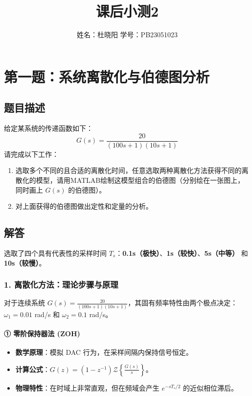 \documentclass{article}
\title{课后小测2}
\author{姓名：杜晓阳 \quad 学号：PB23051023}
\date{}
\begin{document}
\maketitle

\section*{第一题：系统离散化与伯德图分析}

\subsection*{题目描述}
给定某系统的传递函数如下：
\[
G(s) = \frac{20}{(100s+1)(10s+1)}
\]
请完成以下工作：
\begin{enumerate}
    \item 选取多个不同的且合适的离散化时间，任意选取两种离散化方法获得不同的离散化的模型，请用MATLAB绘制这模型组合的伯德图（分别绘在一张图上，同时画上 \( G(s) \) 的伯德图）。
    \item 对上面获得的伯德图做出定性和定量的分析。
\end{enumerate}

\subsection*{解答}

选取了四个具有代表性的采样时间 \( T_s \)：\textbf{0.1s（极快）}、\textbf{1s（较快）}、\textbf{5s（中等）} 和 \textbf{10s（较慢）}。

\subsubsection*{1. 离散化方法：理论步骤与原理}
对于连续系统 \( G(s) = \frac{20}{(100s + 1)(10s + 1)} \)，其固有频率特性由两个极点决定：\( \omega_1 = 0.01 \) rad/s 和 \( \omega_2 = 0.1 \) rad/s。

\paragraph{① 零阶保持器法 (ZOH)}
\begin{itemize}
    \item \textbf{数学原理}：模拟 DAC 行为，在采样间隔内保持信号恒定。
    \item \textbf{计算公式}：\( G(z) = (1-z^{-1}) \mathcal{Z} \left\{ \frac{G(s)}{s} \right\} \)。
    \item \textbf{物理特性}：在时域上非常直观，但在频域会产生 \( e^{-sT_s/2} \) 的近似相位滞后。
\end{itemize}
\end{document}
